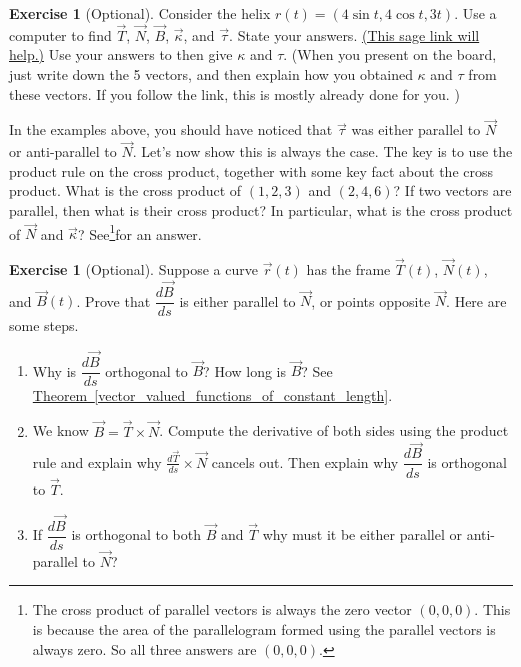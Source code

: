 \documentclass[10pt,]{book}
\theoremstyle{plain}
\theoremstyle{definition}
\theoremstyle{definition}
\theoremstyle{definition}
\theoremstyle{definition}
\newtheorem{exploration}[project]{Exercise}
\theoremstyle{definition}
\numberwithin{equation}{section}
\newcommand{\sageurlforcurvature}{http://bmw.byuimath.com/dokuwiki/doku.php?id=curvature_calculator}
\begin{document}
\begin{exploration}[Optional]\label{exploration-187}
Consider the helix \(r(t)=(4\sin t, 4\cos t, 3t)\). Use a computer to find \(\vec T\), \(\vec N\), \(\vec B\), \(\vec \kappa\), and \(\vec \tau\). State your answers. \href{\\sageurlforcurvature}{(This sage link will help.)} Use your answers to then give \(\kappa\) and \(\tau\). (When you present on the board, just write down the 5 vectors, and then explain how you obtained \(\kappa\) and \(\tau\) from these vectors. If you follow the link, this is mostly already done for you. )%
\end{exploration}
In the examples above, you should have noticed that \(\vec \tau\) was either parallel to \(\vec N\) or anti-parallel to \(\vec N\). Let's now show this is always the case. The key is to use the product rule on the cross product, together with some key fact about the cross product.%
What is the cross product of \((1,2,3)\) and \((2,4,6)\)? If two vectors are parallel, then what is their cross product? In particular, what is the cross product of \(\vec N\) and \(\vec \kappa\)? See\footnote{The cross product of parallel vectors is always the zero vector \((0,0,0)\). This is because the area of the parallelogram formed using the parallel vectors is always zero. So all three answers are \((0,0,0)\).\label{fn-16}}for an answer.%
\begin{exploration}[Optional]\label{exploration-188}
Suppose a curve \(\vec r(t)\) has the frame \(\vec T(t)\), \(\vec N(t)\), and \(\vec B(t)\). Prove that \(\dfrac{d\vec B}{ds}\) is either parallel to \(\vec N\), or points opposite \(\vec N\). Here are some steps. \leavevmode%
\begin{itemize}[label=\textbullet]
\begin{enumerate}[font=\bfseries,label=(\alph*),ref=\alph*]
\item\label{task-461} Why is \(\dfrac{d\vec B}{ds}\) orthogonal to \(\vec B\)? How long is \(\vec B\)? See \hyperref[vector_valued_functions_of_constant_length]{Theorem~\ref{vector_valued_functions_of_constant_length}}.%
%
\item\label{task-462} We know \(\vec B=\vec T\times \vec N\). Compute the derivative of both sides using the product rule and explain why \(\frac{d\vec T}{ds}\times \vec N\) cancels out. Then explain why \(\dfrac{d\vec B}{ds}\) is orthogonal to \(\vec T\).%
\item\label{task-463} If \(\dfrac{d\vec B}{ds}\) is orthogonal to both \(\vec B\) and \(\vec T\) why must it be either parallel or anti-parallel to \(\vec N\)?%
\end{enumerate}
\end{itemize}
%
\end{exploration}
\end{document}

